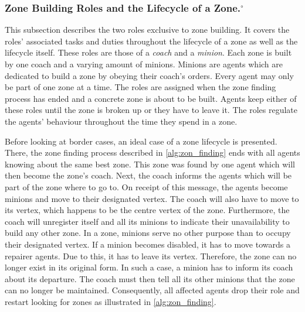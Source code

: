 \subsubsection[Zone Building Roles and the Lifecycle of a Zone.]{Zone Building Roles and the Lifecycle of a Zone.$^\circ$}\label{alg:zon_roles}
This subsection describes the two roles exclusive to zone building.
It covers the roles' associated tasks and duties throughout the lifecycle of a zone as well as the lifecycle itself.
These roles are those of a \emph{coach} and a \emph{minion}.
Each zone is built by one coach and a varying amount of minions.
Minions are agents which are dedicated to build a zone by obeying their coach's orders.
Every agent may only be part of one zone at a time.
The roles are assigned when the zone finding process has ended and a concrete zone is about to be built.
Agents keep either of these roles until the zone is broken up or they have to leave it.
The roles regulate the agents' behaviour throughout the time they spend in a zone.

Before looking at border cases, an ideal case of a zone lifecycle is presented.
There, the zone finding process described in \autoref{alg:zon_finding} ends with all agents knowing about the same best zone.
This zone was found by one agent which will then become the zone's coach.
Next, the coach informs the agents which will be part of the zone where to go to.
On receipt of this message, the agents become minions and move to their designated vertex.
The coach will also have to move to its vertex, which happens to be the centre vertex of the zone.
Furthermore, the coach will unregister itself and all its minions to indicate their unavailability to build any other zone.
In a zone, minions serve no other purpose than to occupy their designated vertex.
If a minion becomes disabled, it has to move towards a repairer agents.
Due to this, it has to leave its vertex.
Therefore, the zone can no longer exist in its original form.
In such a case, a minion has to inform its coach about its departure.
The coach must then tell all its other minions that the zone can no longer be maintained.
Consequently, all affected agents drop their role and restart looking for zones as illustrated in \autoref{alg:zon_finding}.

